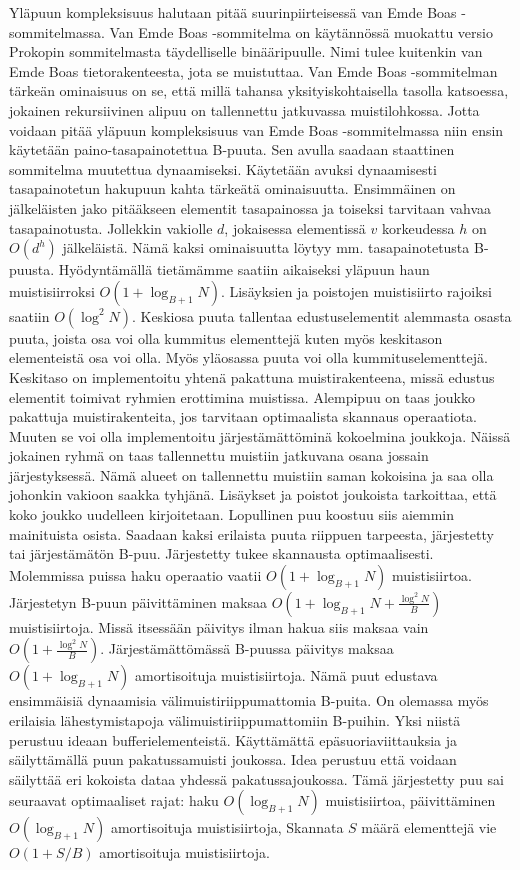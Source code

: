 \documentclass[finnish]{tktltiki2}
\theoremstyle{definition}
\theoremstyle{remark}
\begin{document}
\newline \indent Yläpuun kompleksisuus halutaan pitää suurinpiirteisessä van Emde
Boas -sommitelmassa. Van Emde Boas -sommitelma on käytännössä muokattu versio
Prokopin sommitelmasta täydelliselle binääripuulle. Nimi tulee kuitenkin van
Emde Boas tietorakenteesta, jota se muistuttaa. Van Emde Boas -sommitelman
tärkeän ominaisuus on se, että millä tahansa yksityiskohtaisella tasolla
katsoessa, jokainen rekursiivinen alipuu on tallennettu jatkuvassa
muistilohkossa. Jotta voidaan pitää yläpuun kompleksisuus van Emde Boas
-sommitelmassa niin ensin käytetään paino-tasapainotettua B-puuta. Sen avulla
saadaan staattinen sommitelma muutettua dynaamiseksi. Käytetään avuksi dynaamisesti
tasapainotetun hakupuun kahta tärkeätä ominaisuutta. Ensimmäinen on
jälkeläisten jako pitääkseen elementit tasapainossa ja toiseksi tarvitaan
vahvaa tasapainotusta. Jollekkin vakiolle \(d\), jokaisessa elementissä \(v\)
korkeudessa \(h\) on \(O(d^h)\) jälkeläistä. Nämä kaksi ominaisuutta
löytyy mm. tasapainotetusta B-puusta. Hyödyntämällä tietämämme saatiin aikaiseksi
yläpuun haun muistisiirroksi \(O(1+\log_{B+1}N)\). Lisäyksien ja poistojen muistisiirto rajoiksi
saatiin \(O(\log^2N)\).
\newline \indent Keskiosa puuta tallentaa edustuselementit alemmasta osasta puuta, joista osa
voi olla kummitus elementtejä kuten myös keskitason elementeistä osa voi olla.
Myös yläosassa puuta voi olla kummituselementtejä. Keskitaso on implementoitu
yhtenä pakattuna muistirakenteena, missä edustus elementit toimivat ryhmien
erottimina muistissa. Alempipuu on taas joukko pakattuja muistirakenteita, jos
tarvitaan optimaalista skannaus operaatiota. Muuten se voi olla implementoitu
järjestämättöminä kokoelmina joukkoja. Näissä jokainen ryhmä on taas
tallennettu muistiin jatkuvana osana jossain järjestyksessä. Nämä alueet on
tallennettu muistiin saman kokoisina ja saa olla johonkin vakioon saakka tyhjänä.
Lisäykset ja poistot joukoista tarkoittaa, että koko joukko uudelleen
kirjoitetaan.
\newline \indent Lopullinen puu koostuu siis aiemmin mainituista osista. Saadaan
kaksi erilaista puuta riippuen tarpeesta, järjestetty tai järjestämätön B-puu.
Järjestetty tukee skannausta optimaalisesti. Molemmissa puissa haku operaatio vaatii
\(O(1+\log_{B+1}N)\) muistisiirtoa. Järjestetyn B-puun päivittäminen maksaa
\(O(1+\log_{B+1}N+\tfrac{\log^2 N}{B})\) muistisiirtoja. Missä itsessään päivitys
ilman hakua siis maksaa vain \(O(1+\tfrac{\log^2 N}{B})\). Järjestämättömässä B-puussa
päivitys maksaa \(O(1+\log_{B+1}N)\) amortisoituja muistisiirtoja. Nämä puut edustava ensimmäisiä dynaamisia
välimuistiriippumattomia B-puita.
\newline \indent On olemassa myös erilaisia lähestymistapoja välimuistiriippumattomiin B-puihin.
Yksi niistä perustuu ideaan bufferielementeistä. Käyttämättä epäsuoriaviittauksia
ja säilyttämällä puun pakatussamuisti joukossa. Idea perustuu että voidaan säilyttää
eri kokoista dataa yhdessä pakatussajoukossa. Tämä järjestetty puu sai seuraavat optimaaliset rajat:
haku \(O(\log_{B+1}N)\) muistisiirtoa, päivittäminen \(O(\log_{B+1}N)\) amortisoituja muistisiirtoja, Skannata \(S\) määrä elementtejä
vie \(O(1+S/B)\) amortisoituja muistisiirtoja.
\end{document}

